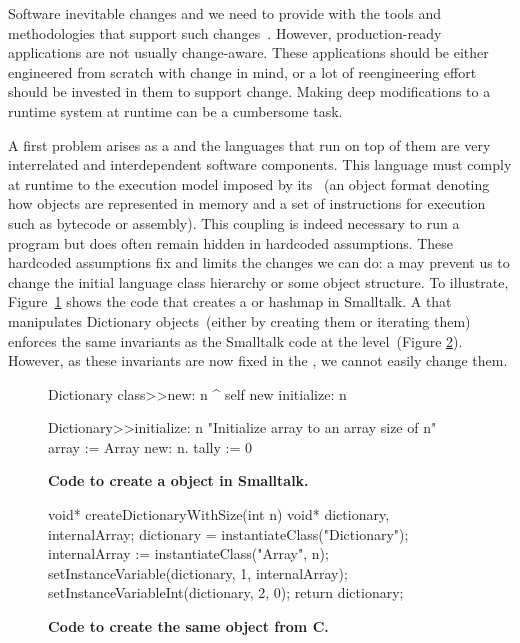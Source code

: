 Software inevitable changes and we need to provide with the tools and methodologies that support such changes~\cite{Nier08b}. However, production-ready applications are not usually change-aware. These applications should be either engineered from scratch with change in mind, or a lot of reengineering effort should be invested in them to support change. Making deep modifications to a runtime system at runtime can be a cumbersome task.

A first problem arises as a \VM and the languages that run on top of them are very interrelated and interdependent software components. 
This language must comply at runtime to the execution model imposed by its \VM~(\eg an object format denoting how objects are represented in memory and a set of instructions for execution such as bytecode or assembly). This coupling is indeed necessary to run a program but does often remain hidden in hardcoded assumptions. These hardcoded \VM assumptions fix and limits the changes we can do: a \VM may prevent us to change the initial language class hierarchy or some object structure. To illustrate, Figure~\ref{code:logic_dup} shows the code that creates a  or hashmap in Smalltalk. A \VM that manipulates Dictionary objects~(either by creating them or iterating them) enforces the same invariants as the Smalltalk code at the \VM level~(Figure \ref{code:logic_dup2}). However, as these invariants are now fixed in the \VM, we cannot easily change them.

\begin{figure}[ht]
\small
\begin{code}
Dictionary class>>new: n
    ^ self new initialize: n

Dictionary>>initialize: n
    "Initialize array to an array size of n"
    array := Array new: n.
    tally := 0
\end{code}
\caption{\textbf{Code to create a  object in Smalltalk.}\label{code:logic_dup}}
\end{figure}

\begin{figure}[ht]
\small
\begin{code}
void* createDictionaryWithSize(int n){
    void* dictionary, internalArray;
    dictionary = instantiateClass("Dictionary");
    internalArray := instantiateClass("Array", n);
    setInstanceVariable(dictionary, 1, internalArray);
    setInstanceVariableInt(dictionary, 2, 0);
    return dictionary;
}
\end{code}
\caption{\textbf{Code to create the same  object from C.}\label{code:logic_dup2}}
\end{figure}

